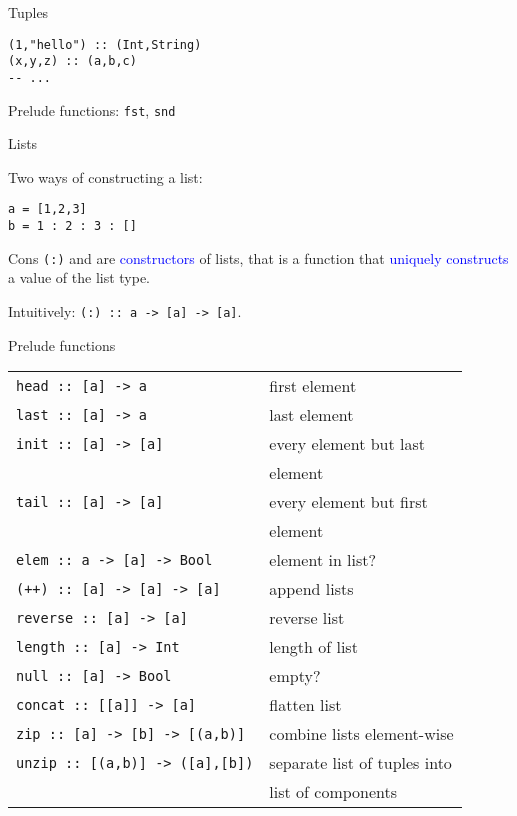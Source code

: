 \documentclass{beamer}
\def\code#1{\texttt{\frenchspacing#1}}
\begin{document}
\begin{frame}[fragile]{Tuples}

\begin{verbatim}
(1,"hello") :: (Int,String)
(x,y,z) :: (a,b,c)
-- ...
\end{verbatim}

Prelude functions: \code{fst}, \code{snd}

\end{frame}

\begin{frame}[fragile]{Lists}

Two ways of constructing a list:

\begin{verbatim}
a = [1,2,3]
b = 1 : 2 : 3 : []
\end{verbatim}

Cons \code{(:)} and \code{[]} are \textcolor{blue}{constructors} of lists, that is a function that \textcolor{blue}{uniquely constructs} a value of the list type.

\pause

\vspace{1cm}
Intuitively: \code{(:) :: a -> [a] -> [a]}.

\end{frame}

\begin{frame}{Prelude functions}

\begin{tabularx}{\textwidth}{ll}
    \code{head :: [a] -> a} & first element \\
    \code{last :: [a] -> a} & last element \\
    \code{init :: [a] -> [a]} & every element but last \\
    & element \\
    \code{tail :: [a] -> [a]} & every element but first \\
    & element \\
    \code{elem :: a -> [a] -> Bool} & element in list? \\
    \code{(++) :: [a] -> [a] -> [a]} & append lists \\
    \code{reverse :: [a] -> [a]} & reverse list \\
    \code{length :: [a] -> Int} & length of list \\
    \code{null :: [a] -> Bool} & empty? \\
    \code{concat :: [[a]] -> [a]} & flatten list \\
    \code{zip :: [a] -> [b] -> [(a,b)]} & combine lists element-wise \\
    \code{unzip :: [(a,b)] -> ([a],[b])} & separate list of tuples into \\
    & list of components \\
\end{tabularx}

\end{frame}
\end{document}
